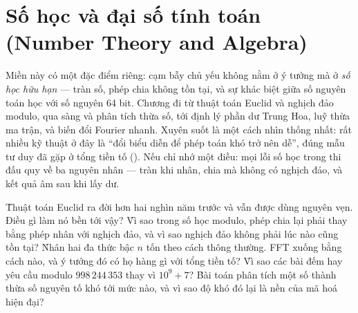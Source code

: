 \documentclass[../../algorithm.tex]{subfiles}
\begin{document}
\chapter{Số học và đại số tính toán (Number Theory and Algebra)}

\begin{tomtat}
Miền này có một đặc điểm riêng: cạm bẫy chủ yếu không nằm ở ý tưởng mà ở \emph{số học hữu hạn} --- tràn số, phép chia không tồn tại, và sự khác biệt giữa số nguyên toán học với số nguyên 64 bit. Chương đi từ thuật toán Euclid và nghịch đảo modulo, qua sàng và phân tích thừa số, tới định lý phần dư Trung Hoa, luỹ thừa ma trận, và biến đổi Fourier nhanh. Xuyên suốt là một cách nhìn thống nhất: rất nhiều kỹ thuật ở đây là ``đổi biểu diễn để phép toán khó trở nên dễ'', đúng mẫu tư duy đã gặp ở tổng tiền tố (). Nếu chỉ nhớ một điều: mọi lỗi số học trong thi đấu quy về ba nguyên nhân --- tràn khi nhân, chia mà không có nghịch đảo, và kết quả âm sau khi lấy dư.
\end{tomtat}

\begin{nentang}
\end{nentang}

\begin{khoigoi}
\h{Thuật toán Euclid ra đời hơn hai nghìn năm trước và vẫn được dùng nguyên vẹn. Điều gì làm nó bền tới vậy?}
\h{Vì sao trong số học modulo, phép chia lại phải thay bằng phép nhân với nghịch đảo, và vì sao nghịch đảo không phải lúc nào cũng tồn tại?}
\h{Nhân hai đa thức bậc \(n\) tốn  theo cách thông thường. FFT xuống  bằng cách nào, và ý tưởng đó có họ hàng gì với tổng tiền tố?}
\h{Vì sao các bài đếm hay yêu cầu modulo \(998\,244\,353\) thay vì \(10^9+7\)?}
\h{Bài toán phân tích một số thành thừa số nguyên tố khó tới mức nào, và vì sao độ khó đó lại là nền của mã hoá hiện đại?}
\end{khoigoi}
\end{document}
